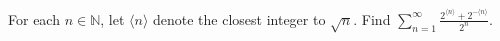 \begin{problem}
    For each \( n\in\mathbb{N} \), let \( \langle n \rangle \) denote the closest integer to \( \sqrt{n} \). Find \( \sum_{n=1}^{\infty} \frac{2^{\langle n \rangle} + 2^{-\langle n \rangle}}{2^n} \).
\end{problem}

